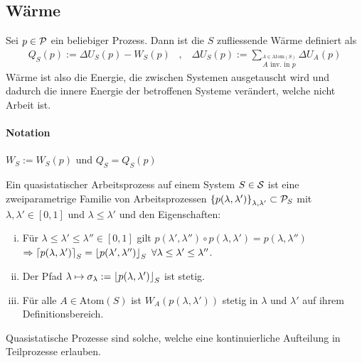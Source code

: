 \subsection{Wärme}

\begin{definition}[Wärme]
    Sei $p \in \P$ ein beliebiger Prozess. Dann ist die $S$ zufliessende
    Wärme definiert als
    \begin{align*}
        Q_S (p) := \Delta U_S (p) - W_S (p)
        \hspace{10pt} , \hspace{10pt}
        \Delta U_S (p) := \sum_{\stackrel{A \in \text{Atom}(S)}{A \text{ inv. in } p}} \Delta U_A (p)
    \end{align*}
    Wärme ist also die Energie, die zwischen Systemen ausgetauscht wird
    und dadurch die innere Energie der betroffenen Systeme verändert, welche
    nicht Arbeit ist.
\end{definition}

\paragraph{Notation} $W_S := W_S(p)$ und $Q_S = Q_S(p)$

\begin{definition}
    Ein quasistatischer Arbeitsprozess auf einem System $S \in \S$ ist eine
    zweiparametrige Familie von Arbeitsprozessen
    $\geschwungeneklammer{p(\lambda,\lambda')}_{\lambda,\lambda'} \subset
    \P_S$ mit $\lambda,\lambda' \in [0,1]$ und $\lambda \leq \lambda'$
    und den Eigenschaften:
    \begin{enumerate}[(i)]
        \item Für $\lambda \leq \lambda' \leq \lambda'' \in [0,1]$ gilt
            $p(\lambda',\lambda'') \circ p(\lambda,\lambda') = p(\lambda,\lambda'')$
            $\Rightarrow \ceil{p(\lambda,\lambda')}_S = \floor{p(\lambda',\lambda'')}_S
            \ \forall \lambda \leq \lambda' \leq \lambda''$.
        \item Der Pfad $\lambda \mapsto \sigma_{\lambda} := \floor{p(\lambda,\lambda')}_S$
            ist stetig.
        \item Für alle $A \in \text{Atom}(S)$ ist $W_A(p(\lambda,\lambda'))$ stetig
            in $\lambda$ und $\lambda'$ auf ihrem Definitionsbereich.
    \end{enumerate}
    Quasistatische Prozesse sind solche, welche eine kontinuierliche
    Aufteilung in Teilprozesse erlauben.
\end{definition}

